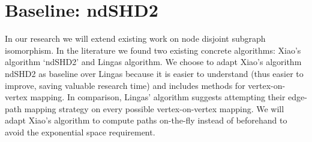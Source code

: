 %
%
%
%
%
%
%
%




\section{Baseline: ndSHD2}
In our research we will extend existing work on node disjoint subgraph isomorphism. In the literature we found two existing concrete algorithms: Xiao's algorithm `ndSHD2'\cite{XIAONODEDISJOINT} and Lingas algorithm\cite{LINGAS2009464}. We choose to adapt Xiao's algorithm ndSHD2 as baseline over Lingas because it is easier to understand (thus easier to improve, saving valuable research time) and includes methods for vertex-on-vertex mapping. In comparison, Lingas' algorithm suggests attempting their edge-path mapping strategy on every possible vertex-on-vertex mapping. We will adapt Xiao's algorithm to compute paths on-the-fly instead of beforehand to avoid the exponential space requirement.

